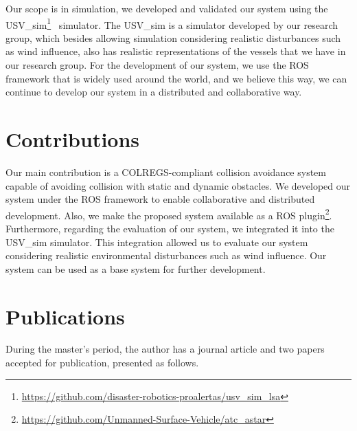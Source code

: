     Our scope is in simulation, we developed and validated our system using the USV\_sim\footnote{\url{https://github.com/disaster-robotics-proalertas/usv\_sim\_lsa}}~\cite{Paravisi2018Toward} simulator. The USV\_sim is a simulator developed by our research group, which besides allowing simulation considering realistic disturbances such as wind influence, also has realistic representations of the vessels that we have in our research group. For the development of our system, we use the \ac{ROS}~\cite{Quigley2009ROS} framework that is widely used around the world, and we believe this way, we can continue to develop our system in a distributed and collaborative way.

    \section{Contributions}
    
     Our main contribution is a \ac{COLREGS}-compliant collision avoidance system capable of avoiding collision with static and dynamic obstacles. We developed our system under the \ac{ROS} framework to enable collaborative and distributed development. Also, we make the proposed system available as a \ac{ROS} plugin\footnote{\url{https://github.com/Unmanned-Surface-Vehicle/atc\_astar}}. Furthermore, regarding the evaluation of our system, we integrated it into the USV\_sim simulator. This integration allowed us to evaluate our system considering realistic environmental disturbances such as wind influence. Our system can be used as a base system for further development.

    \section{Publications}
    
    During the master's period, the author has a journal article and two papers accepted for publication, presented as follows.

